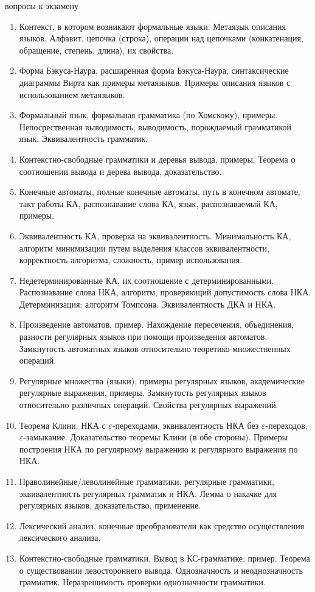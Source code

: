 \documentclass[12pt]{article}
\newcommand{\litem}[1]{\item #1 }%
\begin{document}

{\Large вопросы к экзамену}
\medskip

\begin{enumerate}
  \litem {Контекст, в котором возникают формальные языки. Метаязык описания языков. Алфавит, цепочка (строка), операции над цепочками (конкатенация, обращение, степень, длина), их свойства.} 
  
  \litem {Форма Бэкуса-Наура, расширенная форма Бэкуса-Наура, синтаксические диаграммы Вирта как примеры метаязыков. Примеры описания языков с использованием метаязыков. }
  \litem {Формальный язык, формальная грамматика (по Хомскому), примеры. Непосрественная выводимость, выводимость, порождаемый грамматикой язык. Эквивалентность грамматик. }
  \litem {Контекстно-свободные грамматики и деревья вывода, примеры. Теорема о соотношении вывода и дерева вывода, доказательство.}
  \litem {Конечные автоматы, полные конечные автоматы, путь в конечном автомате, такт работы КА, распознавание слова КА, язык, распознаваемый КА, примеры. }
  \litem {Эквивалентность КА, проверка на эквивалентность. Минимальность КА, алгоритм минимизации путем выделения классов эквивалентности, корректность алгоритма, сложность, пример использования. }
  \litem {Недетерминированные КА, их соотношение с детерминированными. Распознавание слова НКА, алгоритм, проверяющий допустимость слова НКА. Детерминизация: алгоритм Томпсона. Эквивалентность ДКА и НКА.}
  \litem {Произведение автоматов, пример. Нахождение пересечения, объединения, разности регулярных языков при помощи произведения автоматов. Замкнутость автоматных языков относительно теоретико-множественных операций. }
  \litem {Регулярные множества (языки), примеры регулярных языков, академические регулярные выражения, примеры. Замкнутость регулярных языков относительно различных операций. Свойства регулярных выражений. }
  \litem {Теорема Клини. НКА с $\varepsilon$-переходами, эквивалентность НКА без $\varepsilon$-переходов, $\varepsilon$-замыкание. Доказательство теоремы Клини (в обе стороны). Примеры построения НКА по регулярному выражению и регулярного выражения по НКА.}
  \litem {Праволинейные/леволинейные грамматики, регулярные грамматики, эквивалентность регулярных грамматик и НКА. Лемма о накачке для регулярных языков, доказательство, применение. }
  \litem {Лексический анализ, конечные преобразователи как средство осуществления лексического анализа.}
  \litem {Контекстно-свободные грамматики. Вывод в КС-грамматике, пример. Теорема о существовании левостороннего вывода. Однозначность и неоднозначность грамматик. Неразрешимость проверки однозначности грамматики. }

\end{enumerate}
\end{document}
